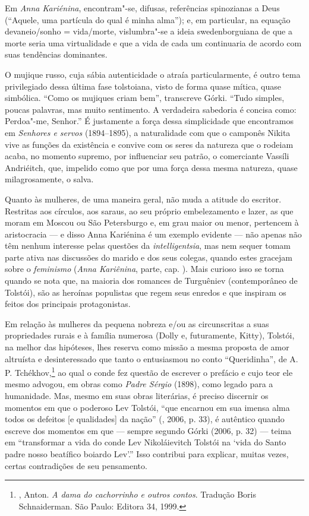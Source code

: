 Em \emph{Anna Kariénina}, encontram"-se, difusas, referências
spinozianas a Deus (``Aquele, uma partícula do qual é minha
alma''); e, em particular, na equação
devaneio/sonho = vida/morte, vislumbra"-se a ideia swedenborguiana
de que a morte seria uma virtualidade e que a vida de cada um
continuaria de acordo com suas tendências dominantes.

O mujique russo, cuja sábia autenticidade o atraía particularmente,
é outro tema privilegiado dessa última fase tolstoiana, visto de
forma quase mítica, quase simbólica. ``Como os mujiques criam bem'',
transcreve Górki. ``Tudo simples, poucas palavras, mas muito
sentimento. A verdadeira sabedoria é concisa como: Perdoa"-me, Senhor.''
É justamente a força dessa simplicidade que encontramos
em \emph{Senhores e servos} (1894--1895), a naturalidade com que o
camponês Nikita vive as funções da existência e convive com os seres da
natureza que o rodeiam acaba, no momento supremo, por influenciar seu
patrão, o comerciante Vassíli Andriéitch, que, impelido como que por uma
força dessa mesma natureza, quase milagrosamente, o salva.

Quanto às mulheres, de uma maneira geral, não muda a atitude do
escritor. Restritas aos círculos, aos saraus, ao seu próprio
embelezamento e lazer, as que moram em Moscou ou São Petersburgo e,
em grau maior ou menor, pertencem à aristocracia --- e disso Anna
Kariénina é um exemplo evidente --- não apenas não têm nenhum
interesse pelas questões da \emph{intelligentsia}, mas nem sequer
tomam parte ativa nas discussões do marido e dos seus colegas,
quando estes gracejam sobre o \emph{feminismo} (\emph{Anna
Kariênina},  parte, cap. ). Mais curioso
isso se torna quando se nota que, na maioria dos romances de
Turguêniev (contemporâneo de Tolstói), são as heroínas populistas
que regem seus enredos e que inspiram os feitos dos principais
protagonistas.

Em relação às mulheres da pequena nobreza e/ou as circunscritas a
suas propriedades rurais e à família numerosa (Dolly e,
futuramente, Kitty), Tolstói, na melhor das hipóteses, lhes
reserva como missão a mesma proposta de amor altruísta e
desinteressado que tanto o entusiasmou no conto ``Queridinha'',
de A. P. Tchékhov,\footnote{, Anton. \emph{A dama
do cachorrinho e outros contos}. Tradução Boris Schnaiderman. São
Paulo: Editora 34, 1999.} ao qual o conde fez questão de escrever
o prefácio e cujo teor ele mesmo advogou, em obras como
\emph{Padre Sérgio} (1898), como legado para a humanidade. Mas, mesmo
em suas obras literárias, é preciso discernir os momentos em que o
poderoso Lev Tolstói, ``que encarnou em sua imensa alma todos os
defeitos [e qualidades] da nação'' (, 2006, p. 33),
é autêntico quando escreve dos momentos em que --- sempre segundo
Górki (2006, p. 32) --- teima em ``transformar a vida do conde Lev
Nikoláievitch Tolstói na ‘vida do Santo padre nosso beatífico boiardo
Lev’.'' Isso contribui para explicar, muitas vezes, certas contradições
de seu pensamento.


